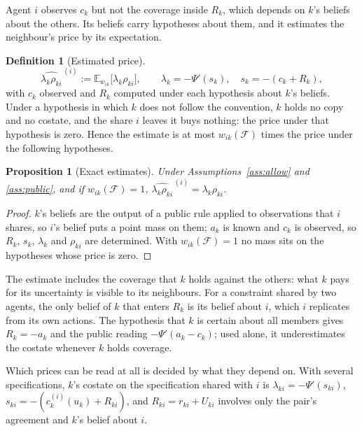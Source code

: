 \documentclass[11pt]{article}
\newtheorem{proposition}[theorem]{Proposition}
\theoremstyle{definition}
\newtheorem{definition}[theorem]{Definition}
\theoremstyle{remark}
\newcommand{\E}{\mathbb{E}}
\newcommand{\F}{\mathcal{F}}
\newcommand{\est}[2]{\widehat{#1}^{\,(#2)}}
\begin{document}
Agent $i$ observes $c_k$ but not the coverage inside $R_k$, which depends on $k$'s beliefs about the others. Its beliefs carry hypotheses about them, and it estimates the neighbour's price by its expectation.

\begin{definition}[Estimated price]\label{def:est}
\[
\est{\lambda_k\rho_{ki}}{i}:=\E_{w_{ik}}\big[\lambda_k\rho_{ki}\big],\qquad\lambda_k=-\Psi'(s_k),\quad s_k=-(c_k+R_k),
\]
with $c_k$ observed and $R_k$ computed under each hypothesis about $k$'s beliefs. Under a hypothesis in which $k$ does not follow the convention, $k$ holds no copy and no costate, and the share $i$ leaves it buys nothing: the price under that hypothesis is zero. Hence the estimate is at most $w_{ik}(\F)$ times the price under the following hypotheses.
\end{definition}

\begin{proposition}[Exact estimates]\label{prop:exact}
Under Assumptions~\ref{ass:allow} and \ref{ass:public}, and if $w_{ik}(\F)=1$, $\est{\lambda_k\rho_{ki}}{i}=\lambda_k\rho_{ki}$.
\end{proposition}
\begin{proof}
$k$'s beliefs are the output of a public rule applied to observations that $i$ shares, so $i$'s belief puts a point mass on them; $a_k$ is known and $c_k$ is observed, so $R_k$, $s_k$, $\lambda_k$ and $\rho_{ki}$ are determined. With $w_{ik}(\F)=1$ no mass sits on the hypotheses whose price is zero.
\end{proof}

The estimate includes the coverage that $k$ holds against the others: what $k$ pays for its uncertainty is visible to its neighbours. For a constraint shared by two agents, the only belief of $k$ that enters $R_k$ is its belief about $i$, which $i$ replicates from its own actions. The hypothesis that $k$ is certain about all members gives $R_k=-a_k$ and the public reading $-\Psi'(a_k-c_k)$; used alone, it underestimates the costate whenever $k$ holds coverage.

Which prices can be read at all is decided by what they depend on. With several specifications, $k$'s costate on the specification shared with $i$ is $\lambda_{ki}=-\Psi'(s_{ki})$, $s_{ki}=-(c^{(i)}_k(u_k)+R_{ki})$, and $R_{ki}=r_{ki}+U_{ki}$ involves only the pair's agreement and $k$'s belief about $i$.
\end{document}
